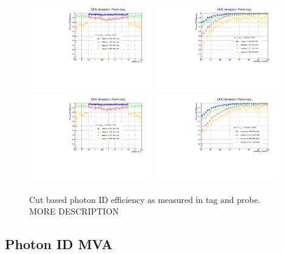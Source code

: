 \begin{figure}
  \includegraphics[width=0.48\textwidth]{ch4_selec_and_cats/plots/eff_7TeV_eta.pdf}
  \includegraphics[width=0.48\textwidth]{ch4_selec_and_cats/plots/eff_7TeV_pt.pdf}
  \includegraphics[width=0.48\textwidth]{ch4_selec_and_cats/plots/eff_7TeV_eta.pdf}
  \includegraphics[width=0.48\textwidth]{ch4_selec_and_cats/plots/eff_8TeV_pt.pdf}
  \caption{Cut based photon ID efficiency as measured in \Zee tag and probe. MORE DESCRIPTION}
  \label{fig:cic_efficiency}
\end{figure}

\subsection{Photon ID MVA}
\label{sec:pho_id_mva}

